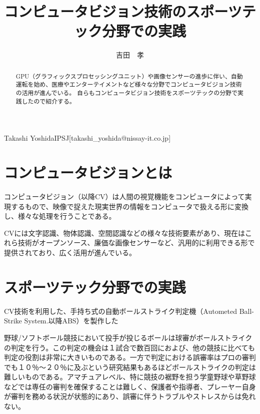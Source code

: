 \documentclass[submit]{ipsj}
\begin{document}
\title{コンピュータビジョン技術のスポーツテック分野での実践}





\author{吉田　孝}{Takashi Yoshida}{IPSJ}[takashi\_yoshida@nissay-it.co.jp]

\begin{abstract}
GPU（グラフィックスプロセッシングユニット）や画像センサーの進歩に伴い、自動運転を始め、医療やエンターテイメントなど様々な分野でコンピュータビジョン技術の活用が進んでいる。
自らもコンピュータビジョン技術をスポーツテックの分野で実践したので紹介する。
\end{abstract}

\maketitle

\section{コンピュータビジョンとは}
コンピュータビジョン（以降CV）は人間の視覚機能をコンピュータによって実現するもので、映像で捉えた現実世界の情報をコンピュータで扱える形に変換し、様々な処理を行うことである。

CVには文字認識、物体認識、空間認識などの様々な技術要素があり、現在はこれら技術がオープンソース、廉価な画像センサーなど、汎用的に利用できる形で提供されており、広く活用が進んでいる。

\section{スポーツテック分野での実践}
CV技術を利用した、手持ち式の自動ボールストライク判定機（Autometed Ball-Strike System.以降ABS）を製作した

野球/ソフトボール競技において投手が投じるボールは球審がボールストライクの判定を行う。この判定の機会は１試合で数百回におよび、他の競技に比べても判定の役割は非常に大きいものである。一方で判定における誤審率はプロの審判でも１０％～２０％に及ぶという研究結果もあるほどボールストライクの判定は難しいものである。アマチュアレベル、特に競技の裾野を担う学童野球や草野球などでは専任の審判を確保することは難しく、保護者や指導者、プレーヤー自身が審判を務める状況が状態的にあり、誤審に伴うトラブルやストレスからは免れない。
\end{document}
